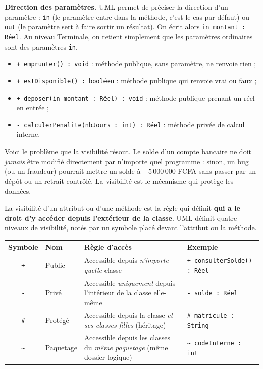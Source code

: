 \documentclass[11pt]{article}
\newcommand{\cle}[1]{{\popxbold\color{popdark}#1}}
\newcounter{popsec}
\newcounter{popsub}
\newcommand{\courssub}[1]{%
  \stepcounter{popsub}%
  \par\vspace{9pt}\noindent{\popxbold\fontsize{11.5}{13}\selectfont\color{popink}{\color{poporange}\thepopsec.\thepopsub}\hspace{6pt}#1}\par\nopagebreak\vspace{4pt}
}
\begin{document}
\textbf{Direction des paramètres.} UML permet de préciser la \cle{direction} d'un paramètre : \texttt{in} (le paramètre entre dans la méthode, c'est le cas par défaut) ou \texttt{out} (le paramètre sert à faire sortir un résultat). On écrit alors \texttt{in montant : R\'eel}. Au niveau Terminale, on retient simplement que les paramètres ordinaires sont des paramètres \texttt{in}.

\begin{exemplebox}
\begin{itemize}
\item \texttt{+ emprunter() : void} : méthode publique, sans paramètre, ne renvoie rien ;
\item \texttt{+ estDisponible() : bool\'een} : méthode publique qui renvoie vrai ou faux ;
\item \texttt{+ deposer(in montant : R\'eel) : void} : méthode publique prenant un réel en entrée ;
\item \texttt{- calculerPenalite(nbJours : int) : R\'eel} : méthode privée de calcul interne.
\end{itemize}
\end{exemplebox}

\courssub{Les quatre niveaux de visibilité}

Voici le problème que la visibilité résout. Le solde d'un compte bancaire ne doit \emph{jamais} être modifié directement par n'importe quel programme : sinon, un bug (ou un fraudeur) pourrait mettre un solde à $-5\,000\,000$ FCFA sans passer par un dépôt ou un retrait contrôlé. La \cle{visibilité} est le mécanisme qui protège les données.

\begin{definition}[Visibilité]
La \cle{visibilité} d'un attribut ou d'une méthode est la règle qui définit \textbf{qui a le droit d'y accéder depuis l'extérieur de la classe}. UML définit quatre niveaux de visibilité, notés par un symbole placé devant l'attribut ou la méthode.
\end{definition}

\begin{center}
\begin{tabularx}{\linewidth}{|c|l|X|l|}
\hline
\rowcolor{popblueL} \textbf{Symbole} & \textbf{Nom} & \textbf{Règle d'accès} & \textbf{Exemple} \\
\hline
\texttt{+} & Public & Accessible depuis \emph{n'importe quelle} classe & \texttt{+ consulterSolde() : R\'eel} \\
\hline
\texttt{-} & Privé & Accessible \emph{uniquement} depuis l'intérieur de la classe elle-même & \texttt{- solde : R\'eel} \\
\hline
\texttt{\#} & Protégé & Accessible depuis la classe \emph{et ses classes filles} (héritage) & \texttt{\# matricule : String} \\
\hline
\texttt{\textasciitilde} & Paquetage & Accessible depuis les classes du \emph{même paquetage} (même dossier logique) & \texttt{\textasciitilde\ codeInterne : int} \\
\hline
\end{tabularx}
\end{center}
\end{document}
